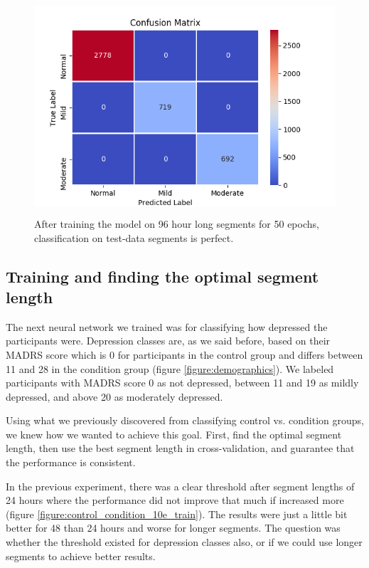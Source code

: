 \begin{figure}
\begin{center}
      \includegraphics[height=8cm]{img/depression_class/conf_5760_60_50_32.png}
      \caption{After training the model on 96 hour long segments for 50 epochs, classification on test-data segments is perfect.}
      \label{figure:depression_class_confusion_matrix_96h}
\end{center}
\end{figure}

\subsection{Training and finding the optimal segment length}

The next neural network we trained was for classifying how depressed the participants were. Depression classes are, as we said before, 
based on their MADRS score which is 0 for participants in the control group and differs between 11 and 28 in the condition group (figure \ref{figure:demographics}). We labeled participants with MADRS score 0 as not depressed, between 11 and 19 as mildly depressed, and above 20 as moderately depressed. 

Using what we previously discovered from classifying control vs. condition groups, we knew how we wanted to achieve this goal. First, find the optimal segment length, then use the best segment length in cross-validation, and guarantee that the performance is consistent. 

In the previous experiment, there was a clear threshold after segment lengths of 24 hours where the performance did not improve that much if increased more (figure \ref{figure:control_condition_10e_train}). The results were just a little bit better for 48 than 24 hours and worse for longer segments. The question was whether the threshold existed for depression classes also, or if we could use longer segments to achieve better results.

